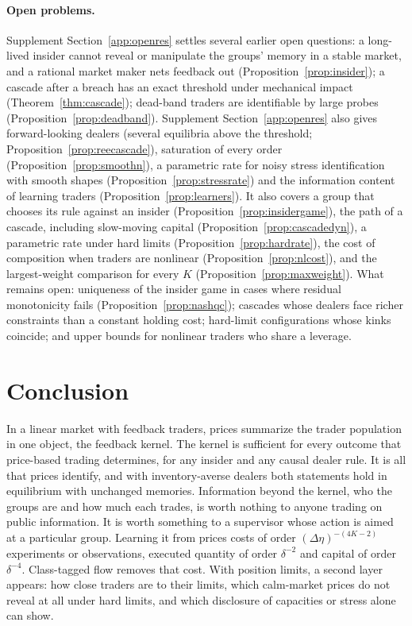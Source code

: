 \documentclass[12pt]{article}
\theoremstyle{definition}
\theoremstyle{remark}
\begin{document}
\paragraph{Open problems.} Supplement Section~\ref{app:openres} settles several earlier open questions: a long-lived insider cannot reveal or manipulate the groups' memory in a stable market, and a rational market maker nets feedback out (Proposition~\ref{prop:insider}); a cascade after a breach has an exact threshold under mechanical impact (Theorem~\ref{thm:cascade}); dead-band traders are identifiable by large probes (Proposition~\ref{prop:deadband}). Supplement Section~\ref{app:openres} also gives forward-looking dealers (several equilibria above the threshold; Proposition~\ref{prop:reecascade}), saturation of every order (Proposition~\ref{prop:smoothn}), a parametric rate for noisy stress identification with smooth shapes (Proposition~\ref{prop:stressrate}) and the information content of learning traders (Proposition~\ref{prop:learners}). It also covers a group that chooses its rule against an insider (Proposition~\ref{prop:insidergame}), the path of a cascade, including slow-moving capital (Proposition~\ref{prop:cascadedyn}), a parametric rate under hard limits (Proposition~\ref{prop:hardrate}), the cost of composition when traders are nonlinear (Proposition~\ref{prop:nlcost}), and the largest-weight comparison for every $K$ (Proposition~\ref{prop:maxweight}). What remains open: uniqueness of the insider game in cases where residual monotonicity fails (Proposition~\ref{prop:nashqc}); cascades whose dealers face richer constraints than a constant holding cost; hard-limit configurations whose kinks coincide; and upper bounds for nonlinear traders who share a leverage.

\section{Conclusion}\label{sec:conclusion}

In a linear market with feedback traders, prices summarize the trader population in one object, the feedback kernel. The kernel is sufficient for every outcome that price-based trading determines, for any insider and any causal dealer rule. It is all that prices identify, and with inventory-averse dealers both statements hold in equilibrium with unchanged memories. Information beyond the kernel, who the groups are and how much each trades, is worth nothing to anyone trading on public information. It is worth something to a supervisor whose action is aimed at a particular group. Learning it from prices costs of order $(\Delta\eta)^{-(4K-2)}$ experiments or observations, executed quantity of order $\delta^{-2}$ and capital of order $\delta^{-4}$. Class-tagged flow removes that cost. With position limits, a second layer appears: how close traders are to their limits, which calm-market prices do not reveal at all under hard limits, and which disclosure of capacities or stress alone can show.
\end{document}
